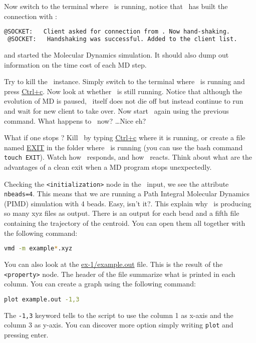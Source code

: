 \documentclass{article}
\begin{document}
\begin{Exercise}[label={i-pi},title={Molecular Dynamics: a client/server approach}]
\Question
Now switch to the terminal where \ipi\ is running, notice
that \ipi\ has built the connection with \pwx:
\begin{lstlisting}[language=sh]
 @SOCKET:   Client asked for connection from . Now hand-shaking.
 @SOCKET:   Handshaking was successful. Added to the client list.
\end{lstlisting}
and started the Molecular Dynamics simulation.
It should also dump out information on the time cost of each MD step.

\Question
Try to kill the \pwx\ instance.  Simply switch to the
terminal where \pwx\ is running and press \url{Ctrl+c}.  Now look at
whether \ipi\ is still running.  Notice that although the evolution of
MD is paused, \ipi\ itself does not die off but instead continue to
run and wait for new client to take over.  Now start \pwx\ again using
the previous command.
What happens to \ipi\ now?  \ldots Nice eh?


\Question
What if one stops \ipi ?  Kill \ipi\ by typing \url{Ctrl+c}
where it is running, or create a file named \url{EXIT} in the folder
where \ipi\ is running (you can use the bash command \texttt{touch
  EXIT}).  Watch how \ipi\ responds, and how \pwx\ reacts.  Think
about what are the advantages of a clean exit when a MD program stops
unexpectedly.


\Question
Checking the \texttt{<initialization>} node in the \ipi\ input, we see
the attribute \texttt{nbeads=4}. This means that we are running a Path
Integral Molecular Dynamics (PIMD) simulation with 4 beads. Easy, isn't it?.
This explain why \ipi\ is producing so many xyz files as output. There
is an output for each bead and a fifth file containing the trajectory
of the centroid. You can open them all together with the following
command:
\begin{lstlisting}[language=bash]
vmd -m example*.xyz
\end{lstlisting}
You can also look at the \url{ex-1/example.out} file. This is the
result of the \texttt{<property>} node. The header of the file
summarize what is printed in each column. You can create a graph using
the following command:
\begin{lstlisting}[language=bash]
plot example.out -1,3
\end{lstlisting}
The \texttt{-1,3} keyword tells to the script to use the column 1 as
x-axis and the column 3 as y-axis. You can discover more option simply
writing \texttt{plot} and pressing enter.
\end{Exercise}
\vspace{1em}
\end{document}
